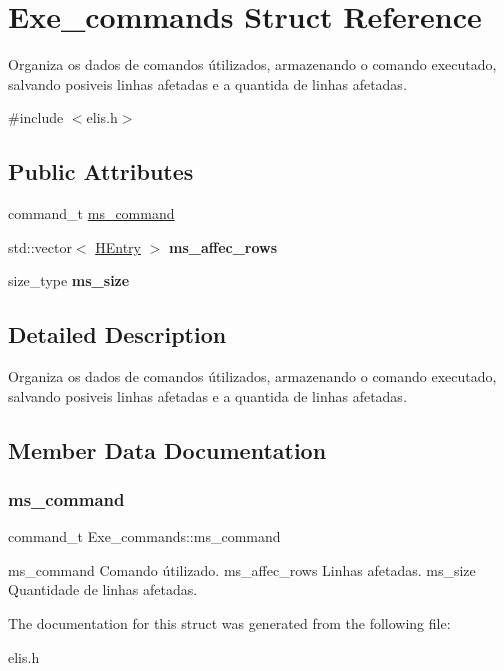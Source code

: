 \hypertarget{structExe__commands}{}\section{Exe\+\_\+commands Struct Reference}
\label{structExe__commands}


Organiza os dados de comandos útilizados, armazenando o comando executado, salvando posiveis linhas afetadas e a quantida de linhas afetadas.  




{\ttfamily \#include $<$elis.\+h$>$}

\subsection*{Public Attributes}
\begin{DoxyCompactItemize}
\item 
command\+\_\+t \hyperlink{structExe__commands_a3a90e35b5983cd726249e9cf4b9174da}{ms\+\_\+command}
\item 
\mbox{\label{structExe__commands_ad6b7356b57f65d346a52153e9c3083e0}} 
std\+::vector$<$ \hyperlink{classac_1_1HashEntry}{H\+Entry} $>$ {\bfseries ms\+\_\+affec\+\_\+rows}
\item 
\mbox{\label{structExe__commands_a48eb06c1198cd4828787234f3d7e6280}} 
size\+\_\+type {\bfseries ms\+\_\+size}
\end{DoxyCompactItemize}


\subsection{Detailed Description}
Organiza os dados de comandos útilizados, armazenando o comando executado, salvando posiveis linhas afetadas e a quantida de linhas afetadas. 

\subsection{Member Data Documentation}
\mbox{\label{structExe__commands_a3a90e35b5983cd726249e9cf4b9174da}} 
\subsubsection{\texorpdfstring{ms\+\_\+command}{ms\_command}}
{\footnotesize\ttfamily command\+\_\+t Exe\+\_\+commands\+::ms\+\_\+command}

ms\+\_\+command Comando útilizado. ms\+\_\+affec\+\_\+rows Linhas afetadas. ms\+\_\+size Quantidade de linhas afetadas. 

The documentation for this struct was generated from the following file\+:\begin{DoxyCompactItemize}
\item 
elis.\+h\end{DoxyCompactItemize}
